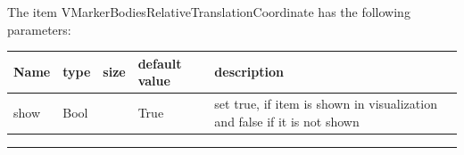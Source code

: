 \noindent The item VMarkerBodiesRelativeTranslationCoordinate has the following parameters:
\begin{center}
  \footnotesize
  \begin{longtable}{| p{4.5cm} | p{2.5cm} | p{0.5cm} | p{2.5cm} | p{6cm} |}
    \hline
    \bf Name & \bf type & \bf size & \bf default value & \bf description \\ \hline
    show &     Bool &      &     True &     set true, if item is shown in visualization and false if it is not shown\\ \hline
\end{longtable}
\end{center}
\par\noindent\rule{\textwidth}{0.4pt}
\label{description_MarkerBodiesRelativeTranslationCoordinate}
